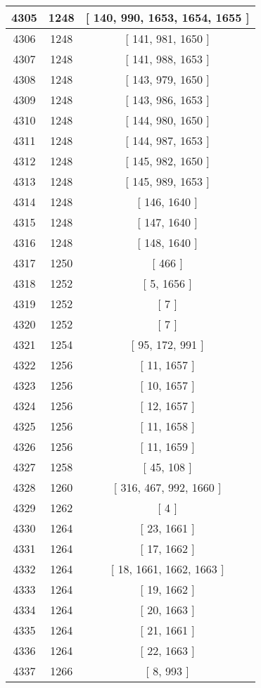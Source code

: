 \begin{center}
\begin{longtable}[H]{|| c c c ||}
\hline
4305 & 1248 & [ 140, 990, 1653, 1654, 1655 ] \\ 
\hline
4306 & 1248 & [ 141, 981, 1650 ] \\ 
\hline
4307 & 1248 & [ 141, 988, 1653 ] \\ 
\hline
4308 & 1248 & [ 143, 979, 1650 ] \\ 
\hline
4309 & 1248 & [ 143, 986, 1653 ] \\ 
\hline
4310 & 1248 & [ 144, 980, 1650 ] \\ 
\hline
4311 & 1248 & [ 144, 987, 1653 ] \\ 
\hline
4312 & 1248 & [ 145, 982, 1650 ] \\ 
\hline
4313 & 1248 & [ 145, 989, 1653 ] \\ 
\hline
4314 & 1248 & [ 146, 1640 ] \\ 
\hline
4315 & 1248 & [ 147, 1640 ] \\ 
\hline
4316 & 1248 & [ 148, 1640 ] \\ 
\hline
4317 & 1250 & [ 466 ] \\ 
\hline
4318 & 1252 & [ 5, 1656 ] \\ 
\hline
4319 & 1252 & [ 7 ] \\ 
\hline
4320 & 1252 & [ 7 ] \\ 
\hline
4321 & 1254 & [ 95, 172, 991 ] \\ 
\hline
4322 & 1256 & [ 11, 1657 ] \\ 
\hline
4323 & 1256 & [ 10, 1657 ] \\ 
\hline
4324 & 1256 & [ 12, 1657 ] \\ 
\hline
4325 & 1256 & [ 11, 1658 ] \\ 
\hline
4326 & 1256 & [ 11, 1659 ] \\ 
\hline
4327 & 1258 & [ 45, 108 ] \\ 
\hline
4328 & 1260 & [ 316, 467, 992, 1660 ] \\ 
\hline
4329 & 1262 & [ 4 ] \\ 
\hline
4330 & 1264 & [ 23, 1661 ] \\ 
\hline
4331 & 1264 & [ 17, 1662 ] \\ 
\hline
4332 & 1264 & [ 18, 1661, 1662, 1663 ] \\ 
\hline
4333 & 1264 & [ 19, 1662 ] \\ 
\hline
4334 & 1264 & [ 20, 1663 ] \\ 
\hline
4335 & 1264 & [ 21, 1661 ] \\ 
\hline
4336 & 1264 & [ 22, 1663 ] \\ 
\hline
4337 & 1266 & [ 8, 993 ] \\ 

\end{longtable}
\end{center}
